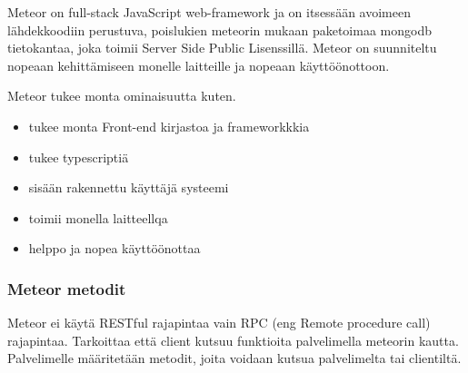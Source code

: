 \documentclass[11pt,a4paper,titlepage,oneside]{article}
\begin{document}







Meteor on full-stack JavaScript web-framework ja on itsessään avoimeen lähdekkoodiin perustuva, 
poislukien meteorin mukaan paketoimaa mongodb tietokantaa, joka toimii Server Side Public Lisenssillä.
Meteor on suunniteltu nopeaan kehittämiseen monelle laitteille ja nopeaan käyttöönottoon.
%
\medskip


    

Meteor tukee monta ominaisuutta kuten.
\begin{itemize}
    \item tukee monta Front-end kirjastoa ja frameworkkkia
    \item tukee typescriptiä
    \item sisään rakennettu käyttäjä systeemi
    \item toimii monella laitteellqa
    \item helppo ja nopea käyttöönottaa 
\end{itemize}




\subsubsection{Meteor metodit}






Meteor ei käytä RESTful rajapintaa vain RPC (eng Remote procedure call) rajapintaa. 
Tarkoittaa että client kutsuu funktioita palvelimella meteorin kautta.
Palvelimelle määritetään metodit, joita voidaan kutsua palvelimelta tai clientiltä.
\end{document}
